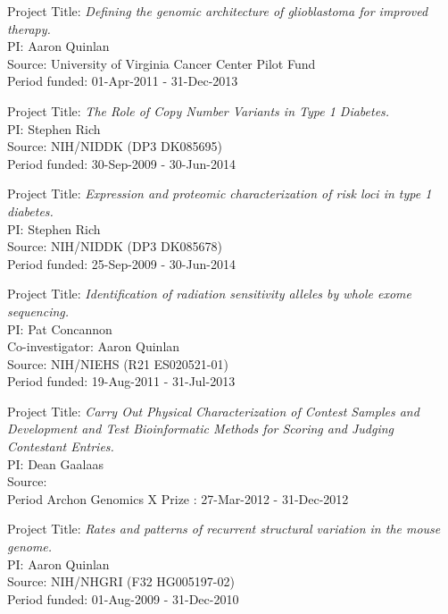 \documentclass[margin,line]{cv}
\begin{document}
\begin{resume}
    \vspace{-2mm}
    Project Title: \textit{Defining the genomic architecture of glioblastoma for improved therapy.} \\
    PI: Aaron Quinlan \\
    Source: University of Virginia Cancer Center Pilot Fund\\
    Period funded: 01-Apr-2011 - 31-Dec-2013

    \vspace{-2mm}
    Project Title: \textit{The Role of Copy Number Variants in Type 1 Diabetes.} \\
    PI: Stephen Rich \\
    Source: NIH/NIDDK (DP3 DK085695)\\
    Period funded: 30-Sep-2009 - 30-Jun-2014

    \vspace{-2mm}
    Project Title: \textit{Expression and proteomic characterization of risk loci in type 1 diabetes.} \\
    PI: Stephen Rich \\
    Source: NIH/NIDDK (DP3 DK085678)\\
    Period funded: 25-Sep-2009 - 30-Jun-2014

    Project Title: \textit{Identification of radiation sensitivity alleles by whole exome sequencing.} \\
    PI: Pat Concannon \\
    Co-investigator: Aaron Quinlan \\
    Source: NIH/NIEHS (R21 ES020521-01) \\
    Period funded: 19-Aug-2011 - 31-Jul-2013

    \vspace{-2mm}
    Project Title: \textit{Carry Out Physical Characterization of Contest Samples and Development and Test Bioinformatic Methods for Scoring and Judging Contestant Entries.}\\
    PI: Dean Gaalaas\\
    Source: \\
    Period Archon Genomics X Prize : 27-Mar-2012 - 31-Dec-2012

    \vspace{-2mm}
    Project Title: \textit{Rates and patterns of recurrent structural variation in the mouse genome.}\\
    PI: Aaron Quinlan\\
    Source: NIH/NHGRI (F32 HG005197-02)\\
    Period funded: 01-Aug-2009 - 31-Dec-2010


\end{resume}
\end{document}
